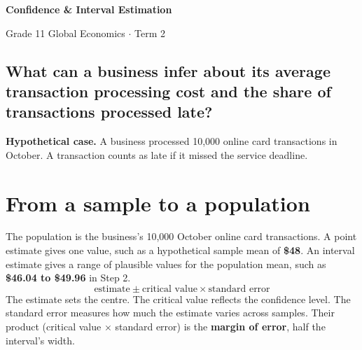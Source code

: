 \makeatletter
{}
\makeatother


\geometry{letterpaper,margin=0.72in}
\linespread{1.06}
\setlength{\parskip}{4pt minus 3pt}
\setcounter{secnumdepth}{1}
\renewcommand{\thesection}{Step \arabic{section}}

\newcommand{\VisualHeading}[1]{\par\smallskip\noindent\textbf{#1}\par\nobreak}
\newcommand{\Criterion}[2]{\par{\small\noindent\textbf{Criterion #1.}\enspace #2\par}}



\begin{center}
  {\LARGE\bfseries Confidence \& Interval Estimation\par}
  \smallskip
  {\large Grade 11 Global Economics \(\cdot\) Term 2\par}
\end{center}

\subsection*{What can a business infer about its average transaction processing cost and the share of transactions processed late?}

\textbf{Hypothetical case.} A business processed 10,000 online card transactions in October. A transaction counts as late if it missed the service deadline.

\section{From a sample to a population}

The population is the business's 10,000 October online card transactions. A point estimate gives one value, such as a hypothetical sample mean of \textbf{\$48}. An interval estimate gives a range of plausible values for the population mean, such as \textbf{\$46.04 to \$49.96} in Step 2.
\[
  \text{estimate} \pm \text{critical value} \times \text{standard error}
\]
The estimate sets the centre. The critical value reflects the confidence level. The standard error measures how much the estimate varies across samples. Their product (critical value \(\times\) standard error) is the \textbf{margin of error}, half the interval's width.

